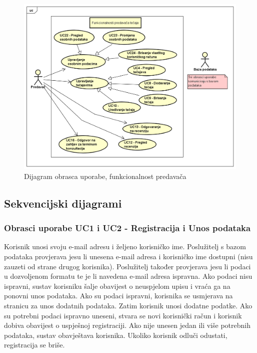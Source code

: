 					\begin{figure}[h]
						\includegraphics[scale=0.6]{dijagrami/UML_pred.PNG}
						\centering
						\caption{Dijagram obrasca uporabe, funkcionalnost predavača}
						\label{fig:UML_pred}
					\end{figure}
				\eject			
				
			\subsection{Sekvencijski dijagrami}
				
				\subsubsection{Obrasci uporabe UC1 i UC2 - Registracija i Unos podataka}
				
					Korisnik unosi svoju e-mail adresu i željeno korisničko ime. Poslužitelj s bazom podataka provjerava jesu li unesena e-mail adresa i korisničko ime dostupni (nisu zauzeti od strane drugog korisnika). Poslužitelj također provjerava jesu li podaci u dozvoljenom formatu te je li navedena e-mail adresa ispravna. Ako podaci nisu ispravni, sustav korisniku šalje obavijest o neuspjelom upisu i vraća ga na ponovni unos podataka. Ako su podaci ispravni, korisnika se usmjerava na stranicu za unos dodatnih podataka. \newline
					Zatim korisnik unosi dodatne podatke. Ako su potrebni podaci ispravno uneseni, stvara se novi korisnički račun i korisnik dobiva obavijest o uspješnoj registraciji. Ako nije unesen jedan ili više potrebnih podataka, sustav obavještava korisnika. Ukoliko korisnik odluči odustati, registracija se briše.
				\eject
				
